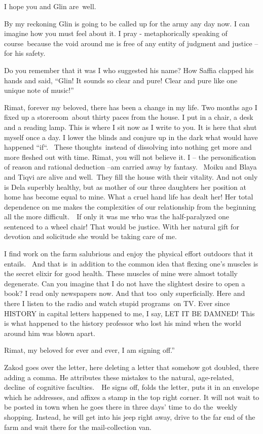 \documentclass[twoside,11pt]{book}
\begin{document}
I hope you and Glin are~well.

By my reckoning Glin is going to be called up for the army any day now. I can imagine how you must feel about it. I pray
- metaphorically speaking of course~because the void around me is free of any entity of judgment and justice -- for his
safety.

Do you remember that it was I who suggested his name? How Saffia clapped his hands and said, ``Glin! It
sounds so clear and pure! Clear and pure like one unique {note of music}!''

Rimat, forever my beloved, there has been a change in my life. Two months ago I fixed up a storeroom~about thirty paces
from the house. I put in a chair, a desk and a reading lamp. This is where I sit now as I write to you. It is here that
shut myself once a day. I lower the blinds and conjure up in the dark what would have happened
``if``.~ These thoughts~instead of dissolving into nothing get more and more fleshed out with
time. Rimat, you will not believe it. I -- the personification of reason and rational deduction --am carried away by
fantasy.~ Moiku and Blaya and Tiqvi are alive and well.\ They fill the house with their vitality. And not only is Dela
superbly healthy, but as mother of our three daughters her position at home has become equal to mine. What a cruel hand
life has dealt her! Her total dependence on me makes the complexities of our relationship from the beginning all the
more difficult.\ \ If only it was me who was the half-paralyzed one sentenced to a wheel chair! That would be justice.
With her natural gift for devotion and solicitude she would be taking care of me.~ 

I find work on the farm salubrious and enjoy the physical effort outdoors that it entails.~ And that is~in addition to
the common idea that flexing one's muscles is the secret elixir for good health. These muscles of mine were almost
totally degenerate. Can you imagine that I do not have the slightest desire to open a book? I read only newspapers now.
And that too\ only superficially. Here and there I listen to the radio and watch stupid programs~on TV. Ever since
HISTORY in capital letters happened to me, I say, LET IT BE DAMNED! This is what happened to the history professor who
lost his mind when the world around him was blown apart.

Rimat, my beloved for ever and ever, I am signing off.{}''

Zakod goes over the letter, here deleting a letter that somehow got doubled, there adding a comma. He attributes these
mistakes to the natural, age-related, decline~of cognitive faculties.\ \ He signs off, folds the letter, puts it in an
envelope which he addresses, and affixes a stamp in the top right corner. It will not wait to be posted in town when he
goes there in three days' time to do the~weekly shopping. Instead, he will get into his jeep right away, drive to the
far end of the farm and wait there for the mail-collection van.
\end{document}
